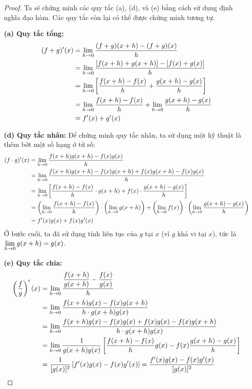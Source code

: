 \begin{proof}
Ta sẽ chứng minh các quy tắc (a), (d), và (e) bằng cách sử dụng định nghĩa đạo hàm. Các quy tắc còn lại có thể được chứng minh tương tự.

\textbf{(a) Quy tắc tổng:}
\begin{align*}
(f+g)'(x) &= \lim\limits_{h \to 0} \dfrac{(f+g)(x+h) - (f+g)(x)}{h} \\
&= \lim\limits_{h \to 0} \dfrac{[f(x+h) + g(x+h)] - [f(x) + g(x)]}{h} \\
&= \lim\limits_{h \to 0} \left[ \dfrac{f(x+h) - f(x)}{h} + \dfrac{g(x+h) - g(x)}{h} \right] \\
&= \lim\limits_{h \to 0} \dfrac{f(x+h) - f(x)}{h} + \lim\limits_{h \to 0} \dfrac{g(x+h) - g(x)}{h} \\
&= f'(x) + g'(x)
\end{align*}

\textbf{(d) Quy tắc nhân:}
Để chứng minh quy tắc nhân, ta sử dụng một kỹ thuật là thêm bớt một số hạng ở tử số:
\begin{align*}
(f \cdot g)'(x) &= \lim\limits_{h \to 0} \dfrac{f(x+h)g(x+h) - f(x)g(x)}{h} \\
&= \lim\limits_{h \to 0} \dfrac{f(x+h)g(x+h) - f(x)g(x+h) + f(x)g(x+h) - f(x)g(x)}{h} \\
&= \lim\limits_{h \to 0} \left[ \dfrac{f(x+h) - f(x)}{h} \cdot g(x+h) + f(x) \cdot \dfrac{g(x+h) - g(x)}{h} \right] \\
&= \left(\lim\limits_{h \to 0} \dfrac{f(x+h) - f(x)}{h}\right) \cdot \left(\lim\limits_{h \to 0} g(x+h)\right) + \left(\lim\limits_{h \to 0} f(x)\right) \cdot \left(\lim\limits_{h \to 0} \dfrac{g(x+h) - g(x)}{h}\right) \\
&= f'(x)g(x) + f(x)g'(x)
\end{align*}
Ở bước cuối, ta đã sử dụng tính liên tục của $g$ tại $x$ (vì $g$ khả vi tại $x$), tức là $\lim\limits_{h \to 0} g(x+h) = g(x)$.

\textbf{(e) Quy tắc chia:}
\begin{align*}
\left(\dfrac{f}{g}\right)'(x) &= \lim\limits_{h \to 0} \dfrac{\dfrac{f(x+h)}{g(x+h)} - \dfrac{f(x)}{g(x)}}{h} \\
&= \lim\limits_{h \to 0} \dfrac{f(x+h)g(x) - f(x)g(x+h)}{h \cdot g(x+h)g(x)} \\
&= \lim\limits_{h \to 0} \dfrac{f(x+h)g(x) - f(x)g(x) + f(x)g(x) - f(x)g(x+h)}{h \cdot g(x+h)g(x)} \\
&= \lim\limits_{h \to 0} \dfrac{1}{g(x+h)g(x)} \left[ \dfrac{f(x+h)-f(x)}{h}g(x) - f(x)\dfrac{g(x+h)-g(x)}{h} \right] \\
&= \dfrac{1}{[g(x)]^2} \left[ f'(x)g(x) - f(x)g'(x) \right] = \dfrac{f'(x)g(x) - f(x)g'(x)}{[g(x)]^2}
\end{align*}
\end{proof}

